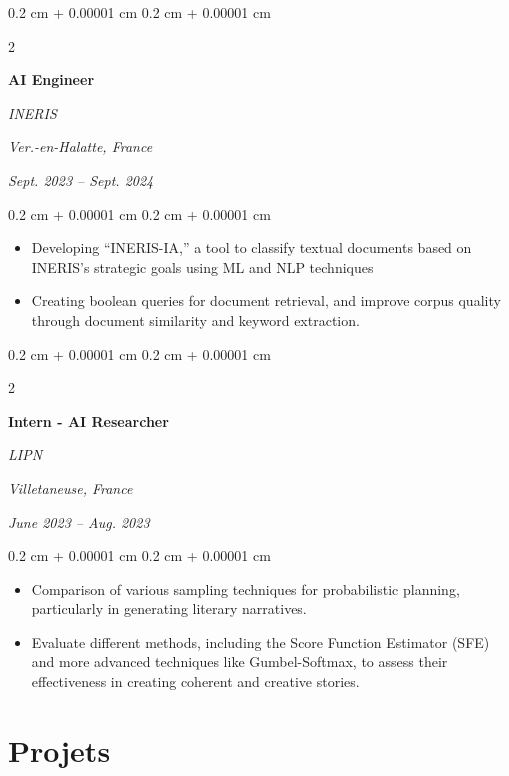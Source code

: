 \documentclass[10pt, letterpaper]{article}
\newenvironment{highlights}{
    \begin{itemize}[
        topsep=0.10 cm,
        parsep=0.10 cm,
        partopsep=0pt,
        itemsep=0pt,
        leftmargin=0.4 cm + 10pt
    ]
}{
    \end{itemize}
} %
\newenvironment{onecolentry}{
    \begin{adjustwidth}{
        0.2 cm + 0.00001 cm
    }{
        0.2 cm + 0.00001 cm
    }
}{
    \end{adjustwidth}
} %
\newenvironment{twocolentry}[2][]{
    \onecolentry
    \def\secondColumn{#2}
    \setcolumnwidth{\fill, 4.5 cm}
    \begin{paracol}{2}
}{
    \switchcolumn \raggedleft \secondColumn
    \end{paracol}
    \endonecolentry
} %
\begin{document}
        \begin{twocolentry}{
            \textit{Ver.-en-Halatte, France}    
                
            \textit{Sept. 2023 – Sept. 2024}}
                \textbf{AI Engineer}
                
                \textit{INERIS}
        \end{twocolentry} 
        \vspace{0.10 cm}
        \begin{onecolentry}
            \begin{highlights}
                \item Developing “INERIS-IA,” a tool to classify textual documents based on INERIS’s strategic goals using ML and NLP techniques
                \item Creating boolean queries for document retrieval, and improve corpus quality through document similarity and keyword extraction.
            \end{highlights}
        \end{onecolentry}
        \vspace{0.2 cm}


        \begin{twocolentry}{
            \textit{Villetaneuse, France}    
                
            \textit{June 2023 – Aug. 2023}}
                \textbf{Intern - AI Researcher}
                
                \textit{LIPN}
        \end{twocolentry}    
        \vspace{0.10 cm}
        \begin{onecolentry}
            \begin{highlights}
                \item Comparison of various sampling techniques for probabilistic planning, particularly in generating literary narratives.
                \item Evaluate different methods, including the Score Function Estimator (SFE) and more advanced techniques like Gumbel-Softmax, to assess their effectiveness in creating coherent and creative stories.
            \end{highlights}
        \end{onecolentry}

        \section{Projets}
\end{document}
